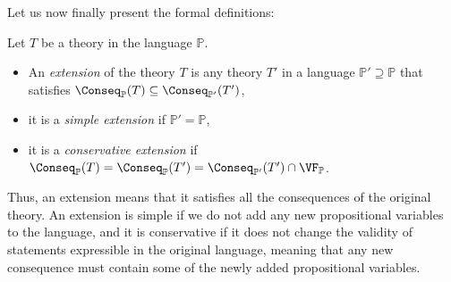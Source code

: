Let us now finally present the formal definitions:

\begin{definition}
    Let $T$ be a theory in the language $\mathbb P$.
    \begin{itemize}
        \item An \emph{extension} of the theory $T$ is any theory $T'$ in a language $\mathbb P' \supseteq \mathbb P$ that satisfies $\Conseq_\mathbb P(T) \subseteq \Conseq_{\mathbb P'}(T')$,
        \item it is a \emph{simple extension} if $\mathbb P' = \mathbb P$,
        \item it is a \emph{conservative extension} if $\Conseq_\mathbb P(T) = \Conseq_\mathbb P(T') = \Conseq_{\mathbb P'}(T') \cap \VF_\mathbb P$.
    \end{itemize}
\end{definition}
Thus, an extension means that it satisfies all the consequences of the original theory. An extension is simple if we do not add any new propositional variables to the language, and it is conservative if it does not change the validity of statements expressible in the original language, meaning that any new consequence must contain some of the newly added propositional variables.

